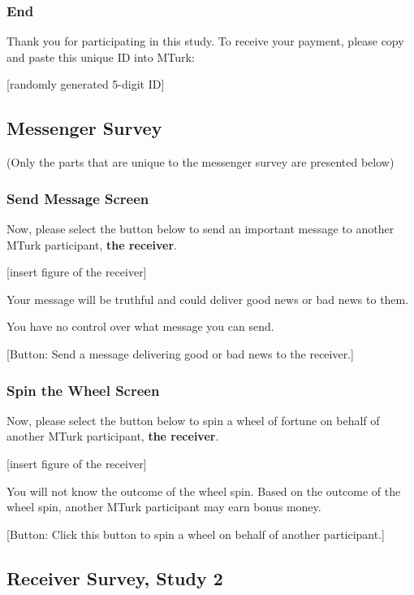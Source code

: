 \subsubsection*{End}

Thank you for participating in this study. To receive your payment, please copy
and paste this unique ID into MTurk: 

[randomly generated 5-digit ID]

\clearpage
\subsection{Messenger Survey}

(Only the parts that are unique to the messenger survey are presented below)

\subsubsection*{Send Message Screen}

Now, please select the button below to send an important
message to another MTurk participant, \textbf{the receiver}.

[insert figure of the receiver]

Your message will be
truthful and could deliver good news or bad news to them. 

You have no control
over what message you can send. 

[Button: Send a message delivering good or bad
news to the receiver.]

\subsubsection*{Spin the Wheel Screen} 

Now, please select the button below to spin a wheel of
fortune on behalf of another MTurk participant, \textbf{the receiver}. 

[insert figure of the receiver]

You will not know
the outcome of the wheel spin. Based on the outcome of the wheel spin, another
MTurk participant may earn bonus money. 

[Button: Click this button to spin a
wheel on behalf of another participant.]

\clearpage
\subsection{Receiver Survey, Study 2}

